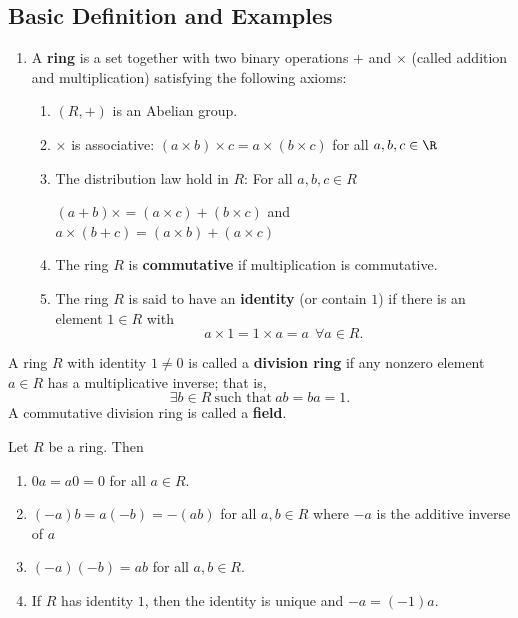 \subsection{Basic Definition and Examples}

\begin{definition}[Rings]
    \begin{enumerate}
        \item[(1)] A \textbf{ring} is a set together with two binary operations \( +  \) and \( \times  \) (called addition and multiplication) satisfying the following axioms: 
   \begin{enumerate}
       \item[(i)] \( (R, + )  \) is an Abelian group.
        \item[(ii)] \( \times  \) is associative: \( (a \times b) \times c  = a \times (b \times c ) \) for all \( a,b,c \in \R  \)
        \item[(iii)] The distribution law hold in \( R  \): For all \( a,b,c \in R  \)
            \begin{center}
                \( (a + b) \times  = (a \times c ) + (b \times c)  \) and \( a \times (b + c ) = (a \times b ) + (a  \times c ) \)
            \end{center}
          \item[(2)] The ring \( R  \) is \textbf{commutative} if multiplication is commutative.  
            \item[(3)] The ring \( R  \) is said to have an \textbf{identity} (or contain \( 1  \)) if there is an element \( 1 \in R  \) with 
                \[  a \times 1 = 1 \times a = a \ \ \forall a \in R.  \]
   \end{enumerate}
    \end{enumerate}
\end{definition}

\begin{definition}
    A ring \( R  \) with identity \( 1 \neq  0  \) is called a \textbf{division ring} if any nonzero element \( a \in R  \) has a multiplicative inverse; that is,  
    \[  \exists b \in R \ \text{such that} \ ab = ba = 1.  \]
    A commutative division ring is called a \textbf{field}.
\end{definition}

\begin{prop}
    Let \( R \) be a ring. Then 
    \begin{enumerate}
        \item[(1)] \( 0a = a 0 = 0  \) for all \( a \in R  \).
        \item[(2)] \( (-a)b = a(-b) = -(ab) \) for all \( a,b \in R  \) where \( -a  \) is the additive inverse of \( a  \)
        \item[(3)] \( (-a)(-b) = ab \) for all \( a,b \in R  \).
        \item[(4)] If \( R  \) has identity \( 1  \), then the identity is unique and \( -a = (-1) a \).
    \end{enumerate}
\end{prop}


